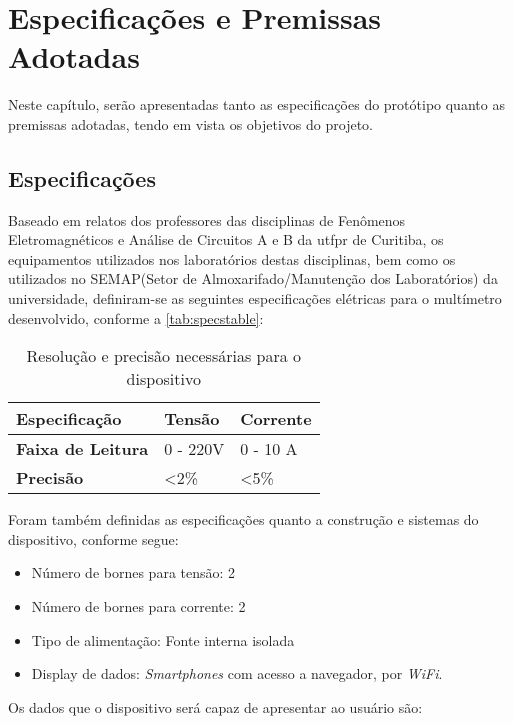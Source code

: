 \chapter{Especificações e Premissas Adotadas}\label{cap:especificacoes}

Neste capítulo, serão apresentadas tanto as especificações do protótipo quanto as premissas adotadas, tendo em vista os objetivos do projeto.

\section{Especificações}\label{spec}
Baseado em relatos dos professores das disciplinas de Fenômenos Eletromagnéticos e Análise de Circuitos A e B da \gls{utfpr} de Curitiba, os equipamentos utilizados nos laboratórios destas disciplinas, bem como os utilizados no \gls{SEMAP}(Setor de Almoxarifado/Manutenção dos Laboratórios) da universidade, definiram-se as seguintes especificações elétricas para o multímetro desenvolvido, conforme a \autoref{tab:specstable}:

\begin{table}[!ht]
    \centering
    \caption{Resolução e precisão necessárias para o dispositivo}
    \label{tab:specstable}
    \begin{tabular}{|l|l|l|}
        \hline
        \textbf{Especificação}    & \textbf{Tensão} & \textbf{Corrente} \\ \hline
        \textbf{Faixa de Leitura} & 0 - 220V        & 0 - 10 A          \\ \hline
        \textbf{Precisão}         & <2\%            & <5\%              \\ \hline
    \end{tabular}
\end{table}

Foram também definidas as especificações quanto a construção e sistemas do dispositivo, conforme segue:

\begin{itemize}
    \item Número de bornes para tensão: 2
    \item Número de bornes para corrente: 2
    \item Tipo de alimentação: Fonte interna isolada
    \item Display de dados: \textit{Smartphones} com acesso a navegador, por \textit{WiFi}.
\end{itemize}

Os dados que o dispositivo será capaz de apresentar ao usuário são:

